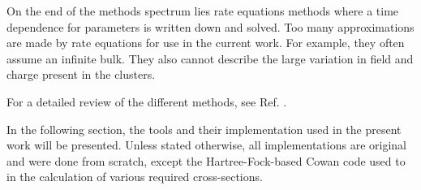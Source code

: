On the end of the methods spectrum lies rate equations methods where a time
dependence for parameters is written down and solved. Too many approximations
are made by rate equations for use in the current work. For example, they often
assume an infinite bulk. They also cannot describe the large variation in field
and charge present in the clusters.

For a detailed review of the different methods, see Ref. \cite{Fennel2010}.

In the following section, the tools and their implementation used in the present
work will be presented. Unless stated otherwise, all implementations are original
and were done from scratch, except the Hartree-Fock-based Cowan code\cite{CowanCode} used to
in the calculation of various required cross-sections.








